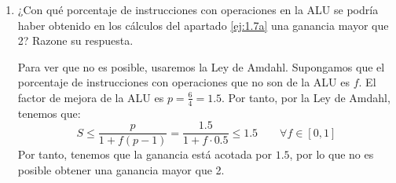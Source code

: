 \begin{ejercicio}
\begin{enumerate}
        \item ¿Con qué porcentaje de instrucciones con operaciones en la ALU se podría haber obtenido en los cálculos del apartado \ref{ej:1.7a} una ganancia mayor que 2?
        Razone su respuesta.

        Para ver que no es posible, usaremos la Ley de Amdahl. Supongamos que el porcentaje de instrucciones con operaciones que no son de la ALU es $f$.
        El factor de mejora de la ALU es $p=\frac{6}{4}=1.5$. Por tanto, por la Ley de Amdahl, tenemos que:
        \begin{equation*}
            S \leq \frac{p}{1+f(p-1)} = \frac{1.5}{1+f\cdot 0.5} \leq 1.5 \qquad \forall f\in [0,1]
        \end{equation*}
        Por tanto, tenemos que la ganancia está acotada por $1.5$, por lo que no es posible obtener una ganancia mayor que 2.
    \end{enumerate}
\end{ejercicio}


